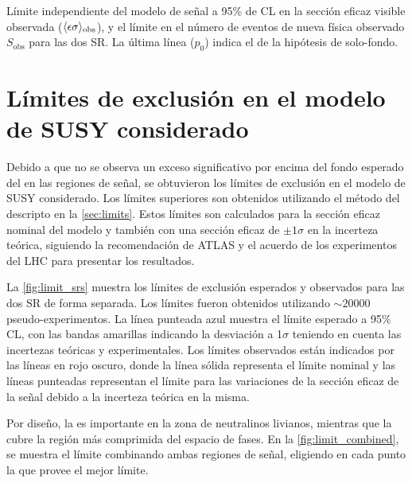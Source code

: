 \begin{table}[!htbp]
  \centering

  \caption{Límite independiente del modelo de señal a 95\% de CL en la
    sección eficaz visible observada ($\langle\epsilon{\rm \sigma}\rangle_{\rm obs}$),
    y el límite en el número de eventos de nueva física observado
    $S_\text{obs}$ para las dos SR.
    La última línea ($p_0$) indica el {\pvalue} de la hipótesis de solo-fondo.}
  \label{tab:upperlimits}

  

\end{table}



\section{Límites de exclusión en el modelo de SUSY considerado}
\label{sec:susy_limits}

Debido a que no se observa un exceso significativo por encima del fondo esperado
del {\SM} en las regiones de señal, se obtuvieron los límites de exclusión en el
modelo de SUSY considerado. Los límites superiores son obtenidos utilizando el
método del {\cls} descripto en la \cref{sec:limits}. Estos límites son
calculados para la sección eficaz nominal del modelo y también con una sección
eficaz de $\pm 1 \sigma$ en la incerteza teórica, siguiendo la recomendación de
ATLAS y el acuerdo de los experimentos del LHC para presentar los resultados.

La \cref{fig:limit_srs} muestra los límites de exclusión esperados y
observados para las dos SR de forma separada. Los límites fueron obtenidos
utilizando $\sim 20000$ pseudo-experimentos. La línea punteada azul muestra el
límite esperado a 95\% CL, con las bandas amarillas indicando la desviación a
1$\sigma$ teniendo en cuenta las incertezas teóricas y experimentales. Los
límites observados están indicados por las líneas en rojo oscuro, donde la línea
sólida representa el límite nominal y las líneas punteadas representan el límite
para las variaciones de la sección eficaz de la señal debido a la incerteza
teórica en la misma.

Por diseño, la {\SRL} es importante en la zona de neutralinos livianos, mientras que
la {\SRH} cubre la región más comprimida del espacio de fases. En la
\cref{fig:limit_combined}, se muestra el límite combinando ambas
regiones de señal, eligiendo en cada punto la que provee el mejor límite.


